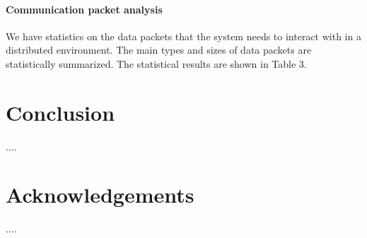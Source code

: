 \documentclass{article}
\begin{document}
\paragraph{Communication packet analysis} 
We have statistics on the data packets that the system needs to interact with in a distributed environment. The main types and sizes of data packets are statistically summarized. The statistical results are shown in Table 3.


\section{Conclusion}
....

\section{Acknowledgements}
....



\end{document}
